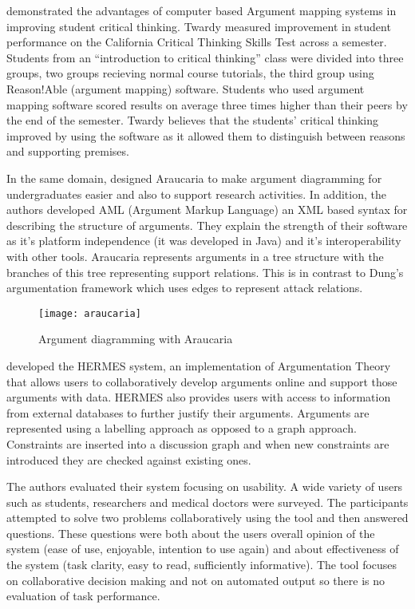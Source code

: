 \cite{twardy2004argument} demonstrated the advantages of computer based Argument mapping systems in improving student critical thinking. Twardy measured improvement in student performance on the California Critical Thinking Skills Test across a semester. Students from an ``introduction to critical thinking'' class were divided into three groups, two groups recieving normal course tutorials, the third group using Reason!Able (argument mapping) software. Students who used argument mapping software scored results on average three times higher than their peers by the end of the semester. Twardy believes that the students' critical thinking improved by using the software as it allowed them to distinguish between reasons and supporting premises.

In the same domain, \cite{reed2001araucaria} designed Araucaria to make argument diagramming for undergraduates easier and also to support research activities. In addition, the authors developed AML (Argument Markup Language) an XML based syntax for describing the structure of arguments. They explain the strength of their software as it's platform independence (it was developed in Java) and it's interoperability with other tools. Araucaria represents arguments in a tree structure with the branches of this tree representing support relations. This is in contrast to Dung's argumentation framework which uses edges to represent attack relations.

\begin{figure}[!h]
\centering
\texttt{[image: araucaria]}
\caption{Argument diagramming with Araucaria}
\label{fig:my_label}
\end{figure}

\cite{karacapilidis2001computer} developed the HERMES system, an implementation of Argumentation Theory that allows users to collaboratively develop arguments online and support those arguments with data. HERMES also provides users with access to information from external databases to further justify their arguments. Arguments are represented using a labelling approach as opposed to a graph approach. Constraints are inserted into a discussion graph and when new constraints are introduced they are checked against existing ones.

The authors evaluated their system focusing on usability. A wide variety of users such as students, researchers and medical doctors were surveyed. The participants attempted to solve two problems collaboratively using the tool and then answered questions. These questions were both about the users overall opinion of the system (ease of use, enjoyable, intention to use again) and about effectiveness of the system (task clarity, easy to read, sufficiently informative). The tool focuses on collaborative decision making and not on automated output so there is no evaluation of task performance.

